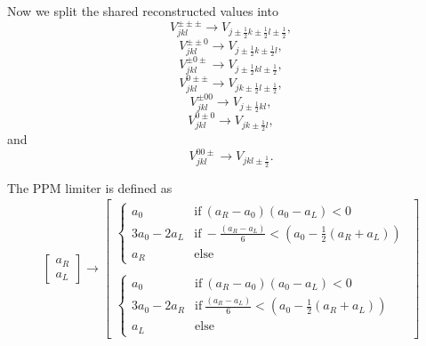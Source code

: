 \documentclass{aastex63}
\begin{document}
Now we split the shared reconstructed values into
\begin{equation}
V^{\pm \pm \pm}_{j k l} \rightarrow V_{j\pm\tfrac{1}{2} k\pm\tfrac{1}{2} l\pm\tfrac{1}{2}},
\end{equation}
\begin{equation}
V^{\pm \pm 0}_{j k l} \rightarrow V_{j\pm\tfrac{1}{2} k\pm\tfrac{1}{2} l},
\end{equation}
\begin{equation}
V^{\pm 0 \pm}_{j k l} \rightarrow V_{j\pm\tfrac{1}{2} k l\pm\tfrac{1}{2}},
\end{equation}
\begin{equation}
V^{0 \pm \pm}_{j k l} \rightarrow V_{j k\pm\tfrac{1}{2} l\pm\tfrac{1}{2}},
\end{equation}
\begin{equation}
V^{\pm 0 0}_{j k l} \rightarrow V_{j\pm\tfrac{1}{2} k l},
\end{equation}
\begin{equation}
V^{0 \pm 0}_{j k l} \rightarrow V_{j k\pm\tfrac{1}{2} l},
\end{equation}
and
\begin{equation}
V^{0 0 \pm}_{j k l} \rightarrow V_{j k l\pm\tfrac{1}{2}}.
\end{equation}


The PPM limiter is defined as
\begin{align}
  \begin{bmatrix}
 	a_R \\
        a_L
  \end{bmatrix} \rightarrow
  \begin{bmatrix}
 	\begin{cases}
             a_0 &  \mathrm{if} \ \left(a_R - a_0\right)\left(a_0 - a_L\right) < 0 \\
             3 a_0 - 2 a_L & \mathrm{if}  \ -\frac{\left(a_R - a_L\right)}{6} < \left(a_0 - \tfrac{1}{2}\left(a_R + a_L\right)\right) \\
             a_R &  \mathrm{else}
        \end{cases} \\
\\
         \begin{cases}
             a_0 &  \mathrm{if} \ \left(a_R - a_0\right)\left(a_0 - a_L\right) < 0 \\
             3 a_0 - 2 a_R & \mathrm{if} \ \frac{\left(a_R - a_L\right)}{6} < \left(a_0 - \tfrac{1}{2}\left(a_R + a_L\right)\right) \\
             a_L &  \mathrm{else}
        \end{cases}
  \end{bmatrix}
\end{align}





\end{document}
